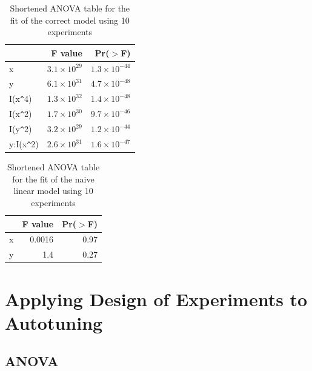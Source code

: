 \documentclass[conference]{IEEEtran}
\begin{document}
\begin{table}[ht]
\centering
\begingroup\small
\begin{tabular}{lrr}
  \toprule
 & F value & Pr($>$F) \\
  \midrule
x           & $3.1 \times 10^{29}$ & $1.3 \times 10^{-44}$ \\
  y           & $6.1 \times 10^{31}$ & $4.7 \times 10^{-48}$ \\
  I(x\verb|^|4)      & $1.3 \times 10^{32}$ & $1.4 \times 10^{-48}$ \\
  I(x\verb|^|2)      & $1.7 \times 10^{30}$ & $9.7 \times 10^{-46}$ \\
  I(y\verb|^|2)      & $3.2 \times 10^{29}$ & $1.2 \times 10^{-44}$ \\
  y:I(x\verb|^|2)    & $2.6 \times 10^{31}$ & $1.6 \times 10^{-47}$ \\
   \bottomrule
\end{tabular}
\endgroup
\caption{Shortened ANOVA table for the fit of the correct model using 10 experiments}
\end{table}

\begin{table}[ht]
\centering
\begingroup\small
\begin{tabular}{lrr}
  \toprule
 & F value & Pr($>$F) \\
  \midrule
x           & 0.0016 & 0.97 \\
  y           & 1.4 & 0.27 \\
   \bottomrule
\end{tabular}
\endgroup
\caption{Shortened ANOVA table for the fit of the naive linear model using 10 experiments}
\end{table}



\section{Applying Design of Experiments to Autotuning}
\label{sec:orgbd28581}
\subsection{ANOVA}
\label{sec:org7e46d58}
\end{document}
